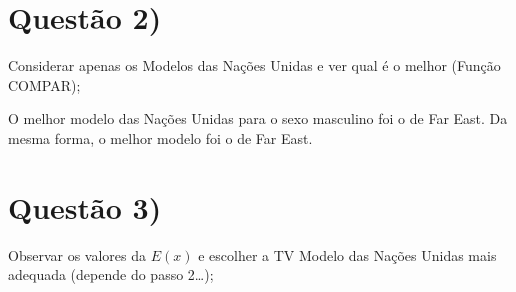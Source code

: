 \documentclass[
  12pt,
  a4paper,
]{scrreprt}
\begin{document}
\begin{figure}
\begin{minipage}{0.50\linewidth}
\begin{figure}[H]
{}


\end{figure}%

\end{minipage}%

\end{figure}%

\section{Questão 2)}\label{questuxe3o-2}

Considerar apenas os Modelos das Nações Unidas e ver qual é o melhor
(Função COMPAR);

\vspace{12pt}

O melhor modelo das Nações Unidas para o sexo masculino foi o de Far
East. Da mesma forma, o melhor modelo foi o de Far East.

\section{Questão 3)}\label{questuxe3o-3}

Observar os valores da \(E\left(x\right)\) e escolher a TV Modelo das
Nações Unidas mais adequada (depende do passo 2\ldots);
\end{document}

